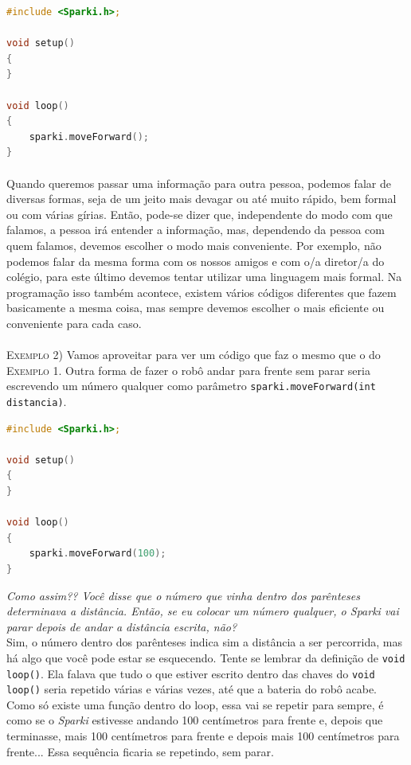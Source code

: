     \begin{lstlisting}[language=C]
#include <Sparki.h>;

void setup()
{
}

void loop()
{
    sparki.moveForward();
}
\end{lstlisting}
    
    \paragraph{}
    Quando queremos passar uma informação para outra pessoa, podemos falar de diversas formas, seja de um jeito mais devagar ou até muito rápido, bem formal ou com várias gírias. Então, pode-se dizer que, independente do modo com que falamos, a pessoa irá entender a informação, mas, dependendo da pessoa com quem falamos, devemos escolher o modo mais conveniente. Por exemplo, não podemos falar da mesma forma com os nossos amigos e com o/a diretor/a do colégio, para este último devemos tentar utilizar uma linguagem mais formal. Na programação isso também acontece, existem vários códigos diferentes que fazem basicamente a mesma coisa, mas sempre devemos escolher o mais eficiente ou conveniente para cada caso.
    \\~\\
    \textsc{Exemplo 2)} Vamos aproveitar para ver um código que faz o mesmo que o do \textsc{Exemplo 1}. Outra forma de fazer o robô andar para frente sem parar seria escrevendo um número qualquer como parâmetro \lstinline[columns=fixed]{sparki.moveForward(int distancia)}.
    
    \begin{lstlisting}[language=C]
#include <Sparki.h>;

void setup()
{
}

void loop()
{
    sparki.moveForward(100);
}
\end{lstlisting}
    
    \textit{Como assim?? Você disse que o número que vinha dentro dos parênteses determinava a distância. Então, se eu colocar um número qualquer, o \textsl{Sparki} vai parar depois de andar a distância escrita, não?} \\
    Sim, o número dentro dos parênteses indica sim a distância a ser percorrida, mas há algo que você pode estar se esquecendo. Tente se lembrar da definição de \lstinline[columns=fixed]{void loop()}. Ela falava que tudo o que estiver escrito dentro das chaves do \lstinline[columns=fixed]{void loop()} seria repetido várias e várias vezes, até que a bateria do robô acabe. Como só existe uma função dentro do loop, essa vai se repetir para sempre, é como se o \textsl{Sparki} estivesse andando 100 centímetros para frente e, depois que terminasse, mais 100 centímetros para frente e depois mais 100 centímetros para frente... Essa sequência ficaria se repetindo, sem parar.
    
